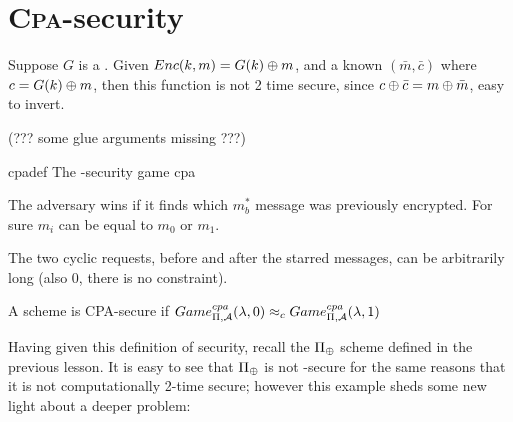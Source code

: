 \section{\textsc{Cpa}-security}

Suppose $G$ is a \prg. Given $Enc(k,m)=G(k) \oplus m$, and a known $(\bar{m}, \bar{c})$ where $c=G(k)\oplus m$, then this function is not 2 time secure, since $c \oplus \bar{c}=m \oplus \bar{m}$, easy to invert.

(??? some glue arguments missing ???)


\begin{cryptogame}
    {cpadef}
    {The \cpa-security game}
    {cpa}


    \cgbeginloop
    \cgendloop

    \seqdelay


    \seqdelay

    \cgbeginloop
    \cgendloop

    \seqdelay


\end{cryptogame}

The adversary wins if it finds which $m_{b}^{*}$ message was previously encrypted. For sure $m_{i}$ can be equal to $m_{0}$ or $m_{1}$.

The two cyclic requests, before and after the starred messages, can be arbitrarily long (also 0, there is no constraint).

\begin{definition}
  A scheme is CPA-secure if $Game_{\Pi, \mathcal{A}}^{cpa}(\lambda,0)
    \approx_{c}Game_{\Pi, \mathcal{A}}^{cpa}(\lambda,1)  $
\end{definition}

Having given this definition of security, recall the $\Pi_{\oplus}$ scheme defined in the previous lesson. It is easy to see that $\Pi_{\oplus}$ is not \cpa-secure for the same reasons that it is not computationally 2-time secure; however this example sheds some new light about a deeper problem:

